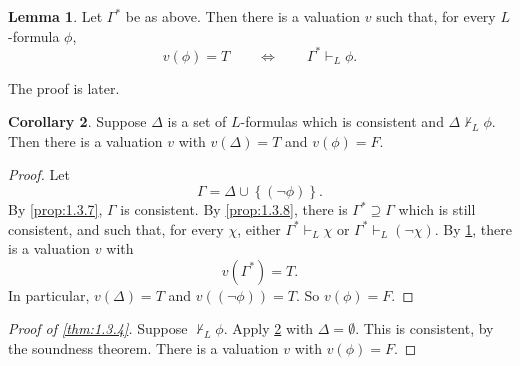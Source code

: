 \documentclass{article}
\newcommand{\rb}[1]{\left( #1 \right)}
\newcommand{\cb}[1]{\left\{ #1 \right\}}
\newcommand{\notb}[1]{\rb{\neg #1}}
\theoremstyle{definition}\newtheorem{definition}{Definition}[subsection]
\theoremstyle{definition}\newtheorem{remark1}[definition]{Remark}
\theoremstyle{definition}\newtheorem{example1}[definition]{Example}
\theoremstyle{definition}\newtheorem*{remark2}{Remark}
\theoremstyle{definition}\newtheorem*{example2}{Example}
\theoremstyle{definition}\newtheorem*{note}{Note}
\theoremstyle{definition}\newtheorem*{notation}{Notation}
\newtheorem{lemma}[definition]{Lemma}
\newtheorem{corollary}[definition]{Corollary}
\begin{document}
\pagebreak


\begin{lemma}
\label{lem:1.3.9}
Let $ \Gamma^* $ be as above. Then there is a valuation $ v $ such that, for every $ L $-formula $ \phi $,
$$ v\rb{\phi} = T \qquad \iff \qquad \Gamma^* \vdash_L \phi. $$
\end{lemma}

The proof is later.

\begin{corollary}
\label{cor:1.3.10}
Suppose $ \Delta $ is a set of $ L $-formulas which is consistent and $ \Delta \not\vdash_L \phi $. Then there is a valuation $ v $ with $ v\rb{\Delta} = T $ and $ v\rb{\phi} = F $.
\end{corollary}

\begin{proof}
Let
$$ \Gamma = \Delta \cup \cb{\notb{\phi}}. $$
By \ref{prop:1.3.7}, $ \Gamma $ is consistent. By \ref{prop:1.3.8}, there is $ \Gamma^* \supseteq \Gamma $ which is still consistent, and such that, for every $ \chi $, either $ \Gamma^* \vdash_L \chi $ or $ \Gamma^* \vdash_L \notb{\chi} $. By \ref{lem:1.3.9}, there is a valuation $ v $ with
$$ v\rb{\Gamma^*} = T. $$
In particular, $ v\rb{\Delta} = T $ and $ v\rb{\notb{\phi}} = T $. So $ v\rb{\phi} = F $.
\end{proof}

\begin{proof}[Proof of \ref{thm:1.3.4}]
Suppose $ \not\vdash_L \phi $. Apply \ref{cor:1.3.10} with $ \Delta = \emptyset $. This is consistent, by the soundness theorem. There is a valuation $ v $ with $ v\rb{\phi} = F $.
\end{proof}
\end{document}
